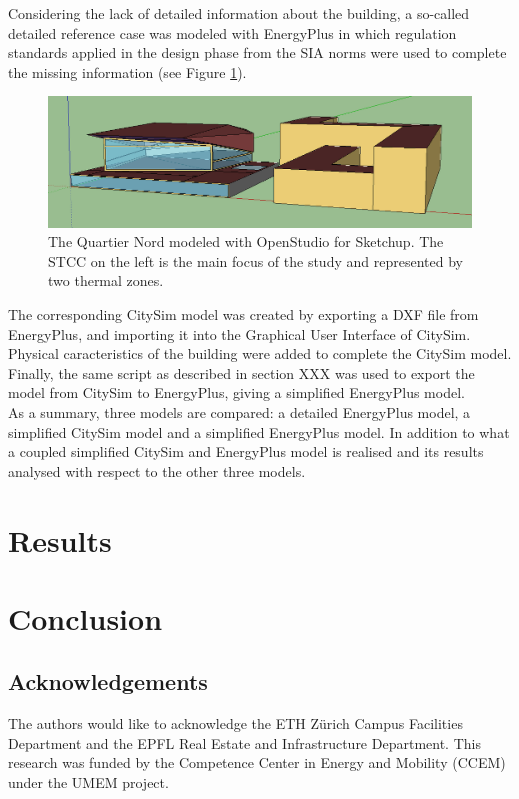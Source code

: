 \documentclass{tBPS2e}
\theoremstyle{plain}
\theoremstyle{definition}
\theoremstyle{remark}
\begin{document}
Considering the lack of detailed information about the building, a so-called detailed reference case was modeled with EnergyPlus \citep{Mauree:2015} in which regulation standards applied in the design phase from the SIA norms were used to complete the missing information (see Figure \ref{fig:model_yang}).

\begin{figure}[H]
\centering
\includegraphics[width=\textwidth]{figures/model_yang}
\caption{The Quartier Nord modeled with OpenStudio for Sketchup. The STCC on the left is the main focus of the study and represented by two thermal zones.}
\label{fig:model_yang}
\end{figure}

The corresponding CitySim model was created by exporting a DXF file from EnergyPlus, and importing it into the Graphical User Interface of CitySim. Physical caracteristics of the building were added to complete the CitySim model. Finally, the same script as described in section XXX was used to export the model from CitySim to EnergyPlus, giving a simplified EnergyPlus model.\\
As a summary, three models are compared: a detailed EnergyPlus model, a simplified CitySim model and a simplified EnergyPlus model. In addition to what a coupled simplified CitySim and EnergyPlus model is realised and its results analysed with respect to the other three models. 


\section{Results}


\section{Conclusion}

\subsection{Acknowledgements}

The authors would like to acknowledge the ETH Z\"urich Campus Facilities Department and the EPFL Real Estate and Infrastructure Department. This research was funded by the Competence Center in Energy and Mobility (CCEM) under the UMEM project.



\end{document}
